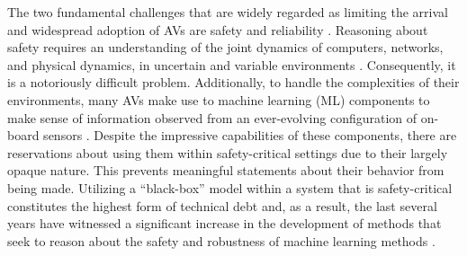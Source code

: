 \documentclass[manuscript,screen,review]{acmart}
\begin{document}
The two fundamental challenges that are widely regarded as limiting the arrival and widespread adoption of AVs are safety and reliability \cite{Majumdar2017}. Reasoning about safety requires an understanding of the joint dynamics of computers, networks, and physical dynamics, in uncertain and variable environments \cite{Yurtsever2019}. Consequently, it is a notoriously difficult problem. Additionally, to handle the complexities of their environments, many AVs make use to machine learning (ML) components to make sense of information observed from an ever-evolving configuration of on-board sensors \cite{Yurtsever2019}. Despite the impressive capabilities of these components, there are reservations about using them within safety-critical settings due to their largely opaque nature. This prevents meaningful statements about their behavior from being made. Utilizing a ``black-box'' model within a system that is safety-critical constitutes the highest form of technical debt \cite{Sculley2015} and, as a result, the last several years have witnessed a significant increase in the development of methods that seek to reason about the safety and robustness of machine learning methods \cite{xiang20118survey}.







\end{document}
